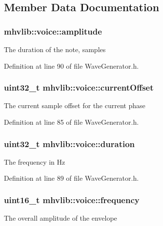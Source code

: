 \subsection{Member Data Documentation}
\hypertarget{structmhvlib_1_1voice_a27ab78996a4d5e289ae149bb81b9bb8c}{
\subsubsection[{amplitude}]{ mhvlib\-::voice\-::amplitude}}\label{structmhvlib_1_1voice_a27ab78996a4d5e289ae149bb81b9bb8c}
The duration of the note, samples 

Definition at line 90 of file Wave\-Generator.\-h.

\hypertarget{structmhvlib_1_1voice_ad9e5ffd23c457eb27268688cbf9c0143}{
\subsubsection[{current\-Offset}]{\setlength{\rightskip}{0pt plus 5cm}uint32\-\_\-t mhvlib\-::voice\-::current\-Offset}}\label{structmhvlib_1_1voice_ad9e5ffd23c457eb27268688cbf9c0143}
The current sample offset for the current phase 

Definition at line 85 of file Wave\-Generator.\-h.

\hypertarget{structmhvlib_1_1voice_a4ad3a0fa2ea88c3cddfde0e47cb60388}{
\subsubsection[{duration}]{\setlength{\rightskip}{0pt plus 5cm}uint32\-\_\-t mhvlib\-::voice\-::duration}}\label{structmhvlib_1_1voice_a4ad3a0fa2ea88c3cddfde0e47cb60388}
The frequency in Hz 

Definition at line 89 of file Wave\-Generator.\-h.

\hypertarget{structmhvlib_1_1voice_a6d2c0939584f4e989e4377d5d997546e}{
\subsubsection[{frequency}]{\setlength{\rightskip}{0pt plus 5cm}uint16\-\_\-t mhvlib\-::voice\-::frequency}}\label{structmhvlib_1_1voice_a6d2c0939584f4e989e4377d5d997546e}
The overall amplitude of the envelope 

